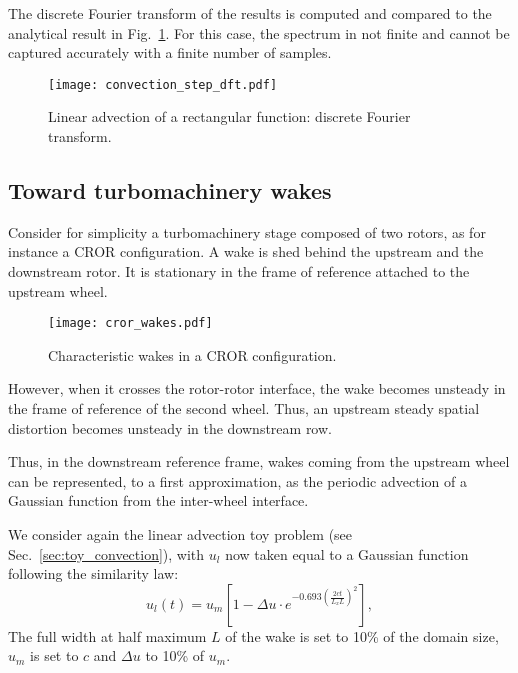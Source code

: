 The discrete Fourier transform of the results
is computed and compared to the analytical result in Fig.~\ref{fig:dft_step}.
For this case, the spectrum in not finite and cannot be captured accurately
with a finite number of samples.

\begin{figure}[htb]
  \centering
  \texttt{[image: convection\_step\_dft.pdf]}
  \caption{Linear advection of a rectangular function: 
  discrete Fourier transform.}
  \label{fig:dft_step}
\end{figure}

\subsection{Toward turbomachinery wakes}
\label{sec:turbomachine_wake}

Consider for simplicity a turbomachinery stage composed of two rotors,
as for instance a CROR configuration.
A wake is shed behind
the upstream and the downstream rotor. 
It is stationary in the frame of reference attached to the upstream wheel.
\begin{figure}[htb]
    \centering\texttt{[image: cror\_wakes.pdf]}
  \caption{Characteristic wakes in a CROR configuration.}
  \label{fig:rotor-stator}
\end{figure}
However, when it crosses the rotor-rotor interface,
the wake becomes unsteady in the frame of reference of the second wheel. 
Thus, an upstream steady spatial distortion becomes unsteady in
the downstream row.

Thus, in the downstream reference frame, wakes coming 
from the upstream wheel can be represented, 
to a first approximation, as the periodic 
advection of a Gaussian function from the inter-wheel interface.

We consider again the linear advection toy problem (see Sec.~\ref{sec:toy_convection}), 
with $u_l$ now taken equal to a Gaussian function following the
\citet{Lakshminarayana1980} similarity law:
\begin{equation}
    u_l (t) = u_m \left[1 - 
        \Delta u \cdot e^{
          -0.693 \left(\frac{2 c t}{L_x L} \right) ^ 2}\right],
\end{equation}
The full width at half maximum $L$ of the wake is set to 10\% of the domain size, 
$u_m$ is set to $c$ and $\Delta u$ to 10\% of $u_m$.

